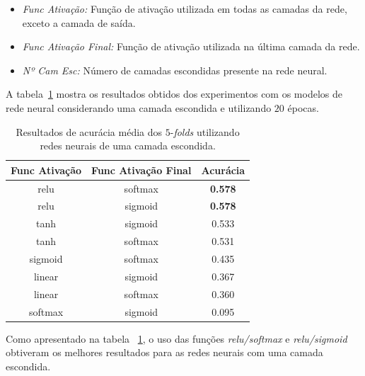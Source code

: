 \documentclass[conference]{IEEEtran}
\begin{document}
\begin{itemize}
	\item \emph{Func Ativação:} Função de ativação utilizada em todas as camadas da rede, exceto a camada de saída.
	
	\item \emph{Func Ativação Final:} Função de ativação utilizada na última camada da rede.
	
	\item \emph{Nº Cam Esc:} Número de camadas escondidas presente na rede neural.
\end{itemize}

 A tabela~\ref{tab:1hl} mostra os resultados obtidos dos experimentos com os modelos de rede neural considerando uma camada escondida e utilizando $20$ épocas.

\begin{table}[h!]
	\centering
	
	\begin{tabular}{ccc} \toprule
		\textbf{Func Ativação} & \textbf{Func Ativação Final} & \textbf{Acurácia} \\ \toprule 
		relu                   & softmax                      & \textbf{0.578}             \\
		relu                   & sigmoid                      & \textbf{0.578}             \\
		tanh                   & sigmoid                      & 0.533             \\
		tanh                   & softmax                      & 0.531             \\	
		sigmoid                & softmax                      & 0.435             \\
		linear                 & sigmoid                      & 0.367             \\
		linear                 & softmax                      & 0.360             \\
		
		softmax                & sigmoid                      & 0.095      \\ \bottomrule      
	\end{tabular}
	\caption{Resultados de acurácia média dos $5$-\emph{folds} utilizando redes neurais de uma camada escondida.}
	\label{tab:1hl}
\end{table}

Como apresentado na tabela ~\ref{tab:1hl}, o uso das funções \emph{relu/softmax} e \emph{relu/sigmoid} obtiveram os melhores resultados para as redes neurais com uma camada escondida.
\end{document}
